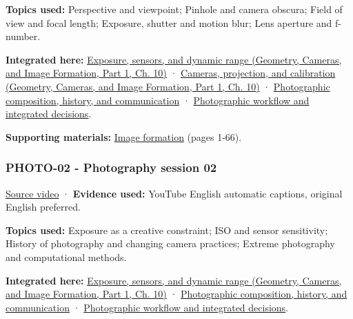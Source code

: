 \textbf{Topics used:} Perspective and viewpoint; Pinhole and camera obscura; Field of view and focal length; Exposure, shutter and motion blur; Lens aperture and f-number.

\textbf{Integrated here:} \href{../03-Geometry-Cameras-and-Image-Formation-P01/main.pdf\#03-visual-computing-i-ch003-exposure-sensors-and-dynamic-range}{Exposure, sensors, and dynamic range (Geometry, Cameras, and Image Formation, Part 1, Ch. 10)} · \href{../03-Geometry-Cameras-and-Image-Formation-P01/main.pdf\#03-visual-computing-i-ch003-cameras-projection-and-calibration}{Cameras, projection, and calibration (Geometry, Cameras, and Image Formation, Part 1, Ch. 10)} · \hyperref[04-visual-computing-ii-ch034-photographic-composition-history-and-communication]{Photographic composition, history, and communication} · \hyperref[04-visual-computing-ii-ch034-photographic-workflow-and-integrated-decisions]{Photographic workflow and integrated decisions}.

\textbf{Supporting materials:} \href{https://drive.google.com/file/d/0B6w2XfPHEcZYdVd4anZzZTc3aE0/view?usp=sharing}{Image formation} (pages 1-66).

\subsubsection{PHOTO-02 - Photography session 02}\label{04-visual-computing-ii-ch036-photo-02---photography-session-02}

\hypertarget{04-visual-computing-ii-ch036-photo-02---photography-session-02}{}

\href{https://www.youtube.com/watch?v=d_sJFslHQsg}{Source video} · \textbf{Evidence used:} YouTube English automatic captions, original English preferred.

\textbf{Topics used:} Exposure as a creative constraint; ISO and sensor sensitivity; History of photography and changing camera practices; Extreme photography and computational methods.

\textbf{Integrated here:} \href{../03-Geometry-Cameras-and-Image-Formation-P01/main.pdf\#03-visual-computing-i-ch003-exposure-sensors-and-dynamic-range}{Exposure, sensors, and dynamic range (Geometry, Cameras, and Image Formation, Part 1, Ch. 10)} · \hyperref[04-visual-computing-ii-ch034-photographic-composition-history-and-communication]{Photographic composition, history, and communication} · \hyperref[04-visual-computing-ii-ch034-photographic-workflow-and-integrated-decisions]{Photographic workflow and integrated decisions}.

